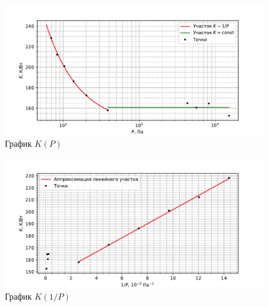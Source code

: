 \documentclass[12pt]{article}
\begin{document}
    \begin{figure}[H]
        \centering
        \includegraphics[width=\textwidth]{graphs/KP.pdf}
        \caption{График $K(P)$}
    \end{figure}

    \begin{figure}[H]
        \centering
        \includegraphics[width=\textwidth]{graphs/KP_lin.pdf}
        \caption{График $K(1/P)$}
    \end{figure}


\newpage
%
\end{document}
